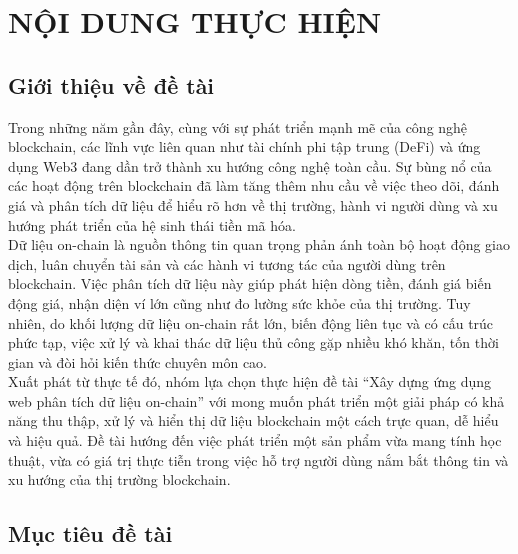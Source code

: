 \documentclass{article}[14pt]
\begin{document}
    \section{NỘI DUNG THỰC HIỆN}
    {

    
    \subsection{Giới thiệu về đề tài}
    \hspace{0.3cm} Trong những năm gần đây, cùng với sự phát triển mạnh mẽ của công nghệ blockchain, các lĩnh vực liên quan như tài chính phi tập trung (DeFi) và ứng dụng Web3 đang dần trở thành xu hướng công nghệ toàn cầu. Sự bùng nổ của các hoạt động trên blockchain đã làm tăng thêm nhu cầu về việc theo dõi, đánh giá và phân tích dữ liệu để hiểu rõ hơn về thị trường, hành vi người dùng và xu hướng phát triển của hệ sinh thái tiền mã hóa.\\

    Dữ liệu on-chain là nguồn thông tin quan trọng phản ánh toàn bộ hoạt động giao dịch, luân chuyển tài sản và các hành vi tương tác của người dùng trên blockchain. Việc phân tích dữ liệu này giúp phát hiện dòng tiền, đánh giá biến động giá, nhận diện ví lớn cũng như đo lường sức khỏe của thị trường. Tuy nhiên, do khối lượng dữ liệu on-chain rất lớn, biến động liên tục và có cấu trúc phức tạp, việc xử lý và khai thác dữ liệu thủ công gặp nhiều khó khăn, tốn thời gian và đòi hỏi kiến thức chuyên môn cao.\\
    
    Xuất phát từ thực tế đó, nhóm lựa chọn thực hiện đề tài “Xây dựng ứng dụng web phân tích dữ liệu on-chain” với mong muốn phát triển một giải pháp có khả năng thu thập, xử lý và hiển thị dữ liệu blockchain một cách trực quan, dễ hiểu và hiệu quả. Đề tài hướng đến việc phát triển một sản phẩm vừa mang tính học thuật, vừa có giá trị thực tiễn trong việc hỗ trợ người dùng nắm bắt thông tin và xu hướng của thị trường blockchain.
    
    
    
    \subsection{Mục tiêu đề tài}
    
}
\end{document}
